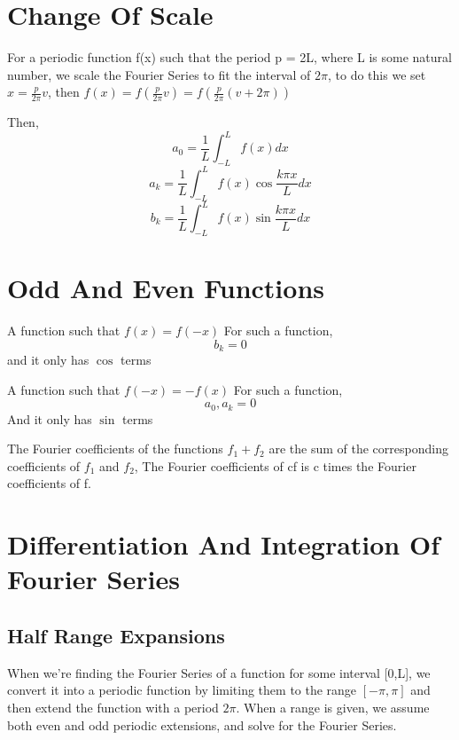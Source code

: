 \documentclass{report}
\begin{document}
\section{Change Of Scale} %
For a periodic function f(x) such that the period p = 2L, where L is some natural number, we scale the Fourier Series to fit the interval of $2\pi$, to do this we set $x = \frac{p}{2\pi}v$, then $f(x) = f(\frac{p}{2\pi}v) = f(\frac{p}{2\pi}(v+2\pi))$

Then, 
\[
     a_0 = \frac{1}{L} \int_{-L}^{L} f(x) dx
\]
\[
  a_k = \frac{1}{L} \int_{-L }^{L} f(x) \cos {\frac{k \pi x}{L}} dx  
\]
\[
 b_k = \frac{1}{L} \int_{-L }^{L} f(x) \sin {\frac{k \pi x}{L}} dx  
\] \section{Odd And Even Functions} %
\begin{definition}
   A function such that $f(x) = f(-x)$
   For such a function,
   \[
   	b_k = 0
   \]
   and it only has $\cos$ terms
   \label{dfn2}
\end{definition} %
\begin{definition}
   A function such that $f(-x) = -f(x)$
   For such a function,
   \[
   	a_0, a_k = 0
   \]
   And it only has $\sin$ terms
\end{definition}

\begin{theorem}
    The Fourier coefficients of the functions $f_1 + f_2$ are the sum of the corresponding coefficients of $f_1$ and $f_2$, The Fourier coefficients of cf is c times the Fourier coefficients of f.

\end{theorem}

\section{Differentiation And Integration Of Fourier Series}

\subsection{Half Range Expansions}
When we're finding the Fourier Series of a function for some interval [0,L], we convert it into a periodic function by limiting them to the range $[-\pi,\pi]$ and then extend the function with a period $2\pi$.
When a range is given, we assume both even and odd periodic extensions, and solve for the Fourier Series. 
\end{document}
